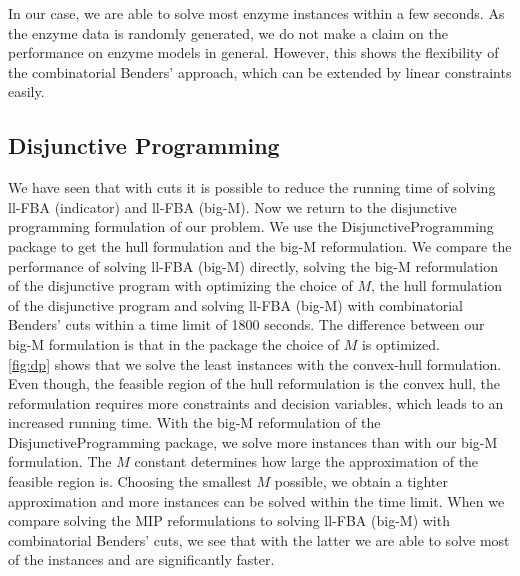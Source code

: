 In our case, we are able to solve most enzyme instances within a few seconds. As the enzyme data is randomly generated, we do not make a claim on the performance on enzyme models in general. However, this shows the flexibility of the combinatorial Benders' approach, which can be extended by linear constraints easily.

\subsection{Disjunctive Programming} \label{section:results_dp}
We have seen that with cuts it is possible to reduce the running time of solving \textsf{ll-FBA (indicator)} and \textsf{ll-FBA (big-M)}. Now we return to the disjunctive programming formulation of our problem. We use the \textsf{DisjunctiveProgramming} package to get the hull formulation and the big-M reformulation. We compare the performance of solving \textsf{ll-FBA (big-M)} directly, solving the big-M reformulation of the disjunctive program with optimizing the choice of $M$, the hull formulation of the disjunctive program and solving \textsf{ll-FBA (big-M)} with combinatorial Benders' cuts within a time limit of 1800 seconds. The difference between our big-M formulation is that in the package the choice of $M$ is optimized. \\
\cref{fig:dp} shows that we solve the least instances with the convex-hull formulation.  
Even though, the feasible region of the hull reformulation is the convex hull, the reformulation requires more constraints and decision variables, which leads to an increased running time. With the big-M reformulation of the \textsf{DisjunctiveProgramming} package, we solve more instances than with our big-M formulation. The $M$ constant determines how large the approximation of the feasible region is. Choosing the smallest $M$ possible, we obtain a tighter approximation and more instances can be solved within the time limit. When we compare solving the MIP reformulations to solving \textsf{ll-FBA (big-M)} with combinatorial Benders' cuts, we see that with the latter we are able to solve most of the instances and are significantly faster.

